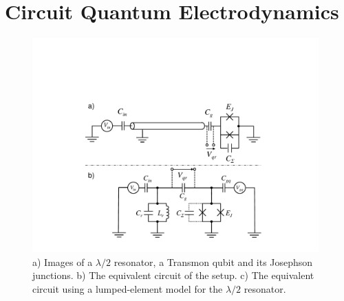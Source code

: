 \section{Circuit Quantum Electrodynamics}

\begin{figure}
	\includegraphics[width=11cm]{"./material/figures/introduction/cqed/cqed"}
	\caption{a) Images of a $\lambda/2$ resonator, a Transmon qubit and its Josephson junctions. b) The equivalent circuit of the setup. c) The equivalent circuit using a lumped-element model for the $\lambda/2$ resonator.}
	\label{fig:CQED}
\end{figure}

